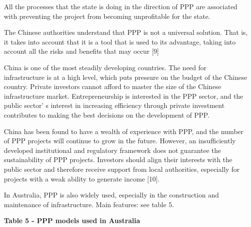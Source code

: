 All the processes that the state is doing in the direction of PPP are
associated with preventing the project from becoming unprofitable for
the state.

The Chinese authorities understand that PPP is not a universal solution.
That is, it takes into account that it is a tool that is used to its
advantage, taking into account all the risks and benefits that may occur
{[}9{]}

China is one of the most steadily developing countries. The need for
infrastructure is at a high level, which puts pressure on the budget of
the Chinese country. Private investors cannot afford to master the size
of the Chinese infrastructure market. Entrepreneurship is interested in
the PPP sector, and the public sector' s interest in
increasing efficiency through private investment contributes to making
the best decisions on the development of PPP.

China has been found to have a wealth of experience with PPP, and the
number of PPP projects will continue to grow in the future. However, an
insufficiently developed institutional and regulatory framework does not
guarantee the sustainability of PPP projects. Investors should align
their interests with the public sector and therefore receive support
from local authorities, especially for projects with a weak ability to
generate income {[}10{]}.

In Australia, PPP is also widely used, especially in the construction
and maintenance of infrastructure. Main features: see table 5.

{\bfseries Table 5 - PPP models used in Australia}

